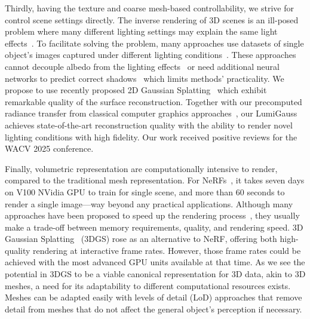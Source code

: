   Thirdly, having the texture and coarse mesh-based controllability, we strive
  for control scene settings directly.
  The inverse rendering of 3D scenes is an ill-posed problem where many
  different lighting settings may explain the same light
  effects~\cite{patow2003survey}.
  To facilitate solving the problem, many approaches use datasets of single
  object's images captured under different lighting
  conditions~\cite{chen2022hallucinated,yang2023crnerf,rudnev2022nerfosr}.
  These approaches cannot decouple albedo from the lighting
  effects~\cite{chen2022hallucinated,yang2023crnerf} or need additional neural
  networks to predict correct shadows~\cite{rudnev2022nerfosr} which limits
  methods' practicality.
  We propose to use recently proposed 2D Gaussian Splatting~\cite{huang20242d}
  which exhibit remarkable quality of the surface reconstruction.
  Together with our precomputed radiance transfer from classical computer
  graphics approaches~\cite{slomp2006gentle,ramamoorthi2001envmap}, our
  LumiGauss achieves state-of-the-art reconstruction quality with the ability to
  render novel lighting conditions with high fidelity.
  Our work received positive reviews for the WACV 2025 conference.

  Finally, volumetric representation are computationally intensive to render,
  compared to the traditional mesh representation.
  For NeRFs~\cite{mildenhall2020nerf}, it takes seven days on V100 NVidia GPU to
  train for single scene, and more than 60 seconds to render a single
  image---way beyond any practical applications.
  Although many approaches have been proposed to speed up the rendering
  process~\cite{garbin2021fastnerf,yu2021plenoctrees,reiser2021kilonerf,hedman2021baking,mueller2022instant},
  they usually make a trade-off between memory requirements, quality, and
  rendering speed.
  3D Gaussian Splatting~\cite{kerbl20233d} (3DGS) rose as an alternative to NeRF, offering both high-quality rendering at interactive frame rates.
  However, those frame rates could be achieved with the most advanced GPU units
  available at that time.
  As we see the potential in 3DGS to be a viable canonical representation for 3D
  data, akin to 3D meshes, a need for its adaptability to different
  computational resources exists.
  Meshes can be adapted easily with levels of detail (LoD) approaches that
  remove detail from meshes that do not affect the general object's perception
  if necessary.

